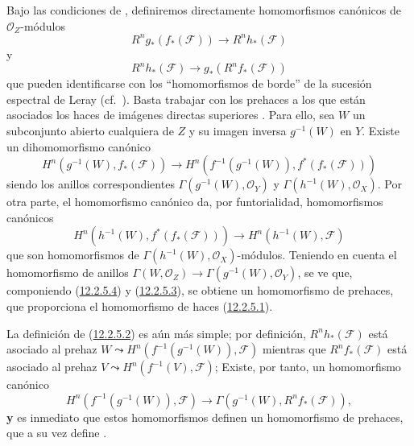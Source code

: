 \begin{env}[12.2.5]
\label{0.12.2.5}
\label{0.12.2.5-fr}
Bajo las condiciones de , definiremos directamente
homomorfismos canónicos de $\mathcal O_Z$-módulos
\[
\label{0.12.2.5.1-fr}
\tag{12.2.5.1}
R^n g_*(f_*(\mathcal F))\longrightarrow R^n h_*(\mathcal F)
\]
y
\[
\label{0.12.2.5.2-fr}
\tag{12.2.5.2}
R^n h_*(\mathcal F)\longrightarrow g_*(R^n f_*(\mathcal F))
\]
que pueden identificarse con los ``homomorfismos de borde'' de la sucesión
espectral de Leray (cf.\ ).
Basta trabajar con los prehaces a los que están asociados los haces de
imágenes directas superiores .
Para ello, sea $W$ un subconjunto abierto cualquiera de $Z$ y su imagen inversa $g^{-1}(W)$ en $Y$.  Existe un
dihomomorfismo canónico
\[
\label{0.12.2.5.3-fr}
\tag{12.2.5.3}
H^n(g^{-1}(W),f_*(\mathcal F))\longrightarrow
H^n(f^{-1}(g^{-1}(W)),f^*(f_*(\mathcal F)))
\]
siendo los anillos correspondientes
$\Gamma(g^{-1}(W),\mathcal O_Y)$ y
$\Gamma(h^{-1}(W),\mathcal O_X)$.
Por otra parte, el homomorfismo canónico
 da, por funtorialidad,
homomorfismos canónicos
\[
\label{0.12.2.5.4-fr}
\tag{12.2.5.4}
H^n(h^{-1}(W),f^*(f_*(\mathcal F)))\longrightarrow
H^n(h^{-1}(W),\mathcal F)
\]
que son homomorfismos de
$\Gamma(h^{-1}(W),\mathcal O_X)$-módulos.
Teniendo en cuenta el homomorfismo de anillos
$\Gamma(W,\mathcal O_Z)\to\Gamma(g^{-1}(W),\mathcal O_Y)$, se ve que, componiendo (\hyperref[0.12.2.5.4-fr]{12.2.5.4}) y (\hyperref[0.12.2.5.3-fr]{12.2.5.3}), se obtiene un homomorfismo de prehaces, que proporciona el homomorfismo de haces (\hyperref[0.12.2.5.1-fr]{12.2.5.1}).

La definición de (\hyperref[0.12.2.5.2-fr]{12.2.5.2}) es aún más simple; por definición, $R^n h_*(\mathcal F)$ está asociado al prehaz
$W\leadsto H^n(f^{-1}(g^{-1}(W)),\mathcal F)$
mientras que $R^n f_*(\mathcal F)$ está asociado al prehaz
$V\leadsto H^n(f^{-1}(V),\mathcal F)$;
Existe, por tanto, un homomorfismo canónico
\[
H^n(f^{-1}(g^{-1}(W)),\mathcal F)\longrightarrow
\Gamma(g^{-1}(W),R^n f_*(\mathcal F)),
\]
\textbf{y} es inmediato que estos homomorfismos definen un homomorfismo de
prehaces, que a su vez define .
\end{env}

